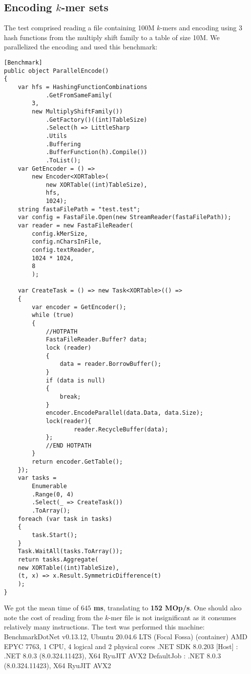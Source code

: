 \subsection{Encoding $k$-mer sets}\label{encoding_kmer_sets}
The test comprised reading a file containing 100M $k$-mers and encoding using 3 hash functions from the multiply shift family to a table of size 10M. We parallelized the encoding and used this benchmark: 
\begin{lstlisting}
[Benchmark]
public object ParallelEncode()
{
    var hfs = HashingFunctionCombinations
            .GetFromSameFamily(
        3,
        new MultiplyShiftFamily())
            .GetFactory()((int)TableSize)
            .Select(h => LittleSharp
            .Utils
            .Buffering
            .BufferFunction(h).Compile())
            .ToList();
    var GetEncoder = () =>
        new Encoder<XORTable>(
            new XORTable((int)TableSize),
            hfs,
            1024);
    string fastaFilePath = "test.test";
    var config = FastaFile.Open(new StreamReader(fastaFilePath));
    var reader = new FastaFileReader(
        config.kMerSize, 
        config.nCharsInFile, 
        config.textReader, 
        1024 * 1024, 
        8
        );

    var CreateTask = () => new Task<XORTable>(() =>
    {
        var encoder = GetEncoder();
        while (true)
        {
            //HOTPATH
            FastaFileReader.Buffer? data;
            lock (reader)
            {
                data = reader.BorrowBuffer();
            }
            if (data is null)
            {
                break;
            }
            encoder.EncodeParallel(data.Data, data.Size);
            lock(reader){
                    reader.RecycleBuffer(data);
            };
            //END HOTPATH
        }
        return encoder.GetTable();
    });
    var tasks =
        Enumerable
        .Range(0, 4)
        .Select(_ => CreateTask())
        .ToArray();
    foreach (var task in tasks)
    {
        task.Start();
    }
    Task.WaitAll(tasks.ToArray());
    return tasks.Aggregate(
    new XORTable((int)TableSize),
    (t, x) => x.Result.SymmetricDifference(t)
    );
}

\end{lstlisting}
We got the mean time of \textbf{ $645$ ms}, translating to \textbf{152 MOp/s}. One should also note the cost of reading from the $k$-mer file is not insignificant as it consumes relatively many instructions. The test was performed this machine: BenchmarkDotNet v0.13.12, Ubuntu 20.04.6 LTS (Focal Fossa) (container)
AMD EPYC 7763, 1 CPU, 4 logical and 2 physical cores
.NET SDK 8.0.203
  [Host]     : .NET 8.0.3 (8.0.324.11423), X64 RyuJIT AVX2
  DefaultJob : .NET 8.0.3 (8.0.324.11423), X64 RyuJIT AVX2
